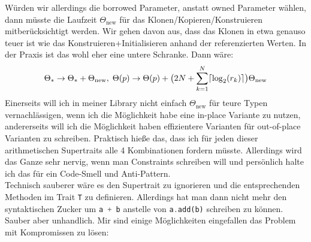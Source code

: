 \documentclass[12pt]{article}
\begin{document}
Würden wir allerdings die borrowed Parameter, anstatt owned Parameter wählen, dann müsste die Laufzeit $\Theta_{\text{new}}$ für das Klonen/Kopieren/Konstruieren mitberücksichtigt werden. Wir gehen davon aus, dass das Klonen in etwa genauso teuer ist wie das Konstruieren+Initialisieren anhand der referenzierten Werten. In der Praxis ist das wohl eher eine untere Schranke. Dann wäre:
\begin{align}
\Theta_* \to \Theta_* + \Theta_{\text{new}},\; \Theta(p) \to \Theta(p) + \big(2N + \sum_{k=1}^N \lceil\log_2(r_k)\rceil\big) \Theta_{\text{new}}
\end{align}
Einerseits will ich in meiner Library nicht einfach $\Theta_{\text{new}}$ für teure Typen vernachlässigen, wenn ich die Möglichkeit habe eine in-place Variante zu nutzen, andererseits will ich die Möglichkeit haben effizientere Varianten für out-of-place Varianten zu schreiben. Praktisch hieße das, dass ich für jeden dieser arithmetischen Supertraits alle 4 Kombinationen fordern müsste. Allerdings wird das Ganze sehr nervig, wenn man Constraints schreiben will und persönlich halte ich das für ein Code-Smell und Anti-Pattern.\\
Technisch sauberer wäre es den Supertrait zu ignorieren und die entsprechenden Methoden im Trait \texttt T zu definieren. Allerdings hat man dann nicht mehr den syntaktischen Zucker um \lstinline[language=Rust]|a + b| anstelle von \lstinline[language=Rust]|a.add(b)| schreiben zu können. Sauber aber unhandlich. Mir sind einige Möglichkeiten eingefallen das Problem mit Kompromissen zu lösen:
\end{document}
